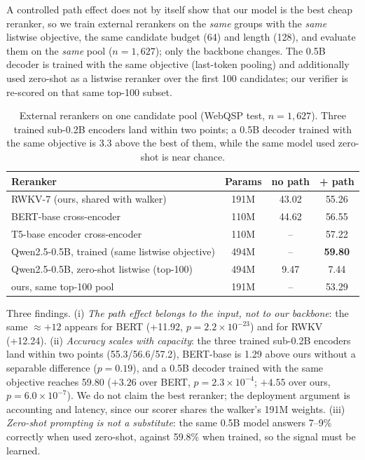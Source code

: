\documentclass[sigconf,review]{acmart}
\begin{document}
A controlled path effect does not by itself show that our model is the best cheap reranker, so we train external rerankers on the \emph{same} groups with the \emph{same} listwise objective, the same candidate budget (64) and length (128), and evaluate them on the \emph{same} pool ($n=1{,}627$); only the backbone changes. The 0.5B decoder is trained with the same objective (last-token pooling) and additionally used zero-shot as a listwise reranker over the first 100 candidates; our verifier is re-scored on that same top-100 subset.

\begin{table}[t]
\centering\footnotesize
\caption{External rerankers on one candidate pool (WebQSP test, $n=1{,}627$). Three trained sub-0.2B encoders land within two points; a 0.5B decoder trained with the same objective is 3.3 above the best of them, while the same model used zero-shot is near chance.}
\label{tab:external}
\begin{tabular}{lccc}
\toprule
Reranker & Params & no path & + path \\
\midrule
RWKV-7 (ours, shared with walker) & 191M & 43.02 & 55.26 \\
BERT-base cross-encoder & 110M & 44.62 & 56.55 \\
T5-base encoder cross-encoder & 110M & -- & 57.22 \\
Qwen2.5-0.5B, trained (same listwise objective) & 494M & -- & \textbf{59.80} \\
Qwen2.5-0.5B, zero-shot listwise (top-100) & 494M & 9.47 & 7.44 \\
\quad ours, same top-100 pool & 191M & -- & 53.29 \\
\bottomrule
\end{tabular}
\end{table}

Three findings. (i) \emph{The path effect belongs to the input, not to our backbone}: the same $\approx+12$ appears for BERT (+11.92, $p=2.2\times10^{-23}$) and for RWKV (+12.24). (ii) \emph{Accuracy scales with capacity}: the three trained sub-0.2B encoders land within two points (55.3/56.6/57.2), BERT-base is 1.29 above ours without a separable difference ($p=0.19$), and a 0.5B decoder trained with the same objective reaches 59.80 ($+3.26$ over BERT, $p=2.3\times10^{-4}$; $+4.55$ over ours, $p=6.0\times10^{-7}$). We do not claim the best reranker; the deployment argument is accounting and latency, since our scorer shares the walker's 191M weights. (iii) \emph{Zero-shot prompting is not a substitute}: the same 0.5B model answers 7--9\% correctly when used zero-shot, against 59.8\% when trained, so the signal must be learned.
\end{document}
